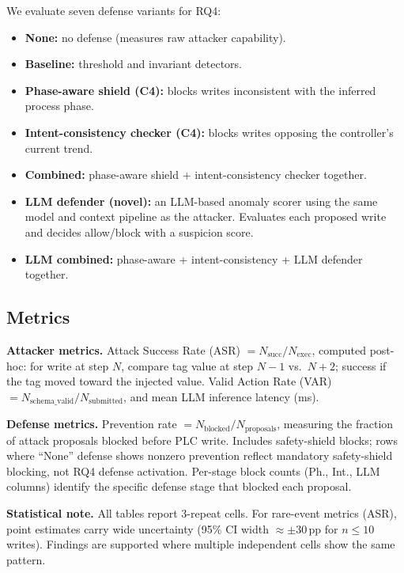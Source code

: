 We evaluate seven defense variants for RQ4:

\begin{itemize}[leftmargin=1.5em]
    \item \textbf{None:} no defense (measures raw attacker capability).
    \item \textbf{Baseline:} threshold and invariant detectors.
    \item \textbf{Phase-aware shield (C4):} blocks writes inconsistent with the inferred process phase.
    \item \textbf{Intent-consistency checker (C4):} blocks writes opposing the controller's current trend.
    \item \textbf{Combined:} phase-aware shield + intent-consistency checker together.
    \item \textbf{LLM defender (novel):} an LLM-based anomaly scorer using the same model and context pipeline as the attacker. Evaluates each proposed write and decides allow/block with a suspicion score.
    \item \textbf{LLM combined:} phase-aware + intent-consistency + LLM defender together.
\end{itemize}

\subsection{Metrics}

\textbf{Attacker metrics.} Attack Success Rate (ASR) $= N_{\text{succ}}/N_{\text{exec}}$, computed post-hoc: for write at step $N$, compare tag value at step $N{-}1$ vs.\ $N{+}2$; success if the tag moved toward the injected value. Valid Action Rate (VAR) $= N_{\text{schema\_valid}}/N_{\text{submitted}}$, and mean LLM inference latency (ms).

\textbf{Defense metrics.} Prevention rate $= N_{\text{blocked}}/N_{\text{proposals}}$, measuring the fraction of attack proposals blocked before PLC write. Includes safety-shield blocks; rows where ``None'' defense shows nonzero prevention reflect mandatory safety-shield blocking, not RQ4 defense activation. Per-stage block counts (Ph., Int., LLM columns) identify the specific defense stage that blocked each proposal.

\textbf{Statistical note.} All tables report 3-repeat cells. For rare-event metrics (ASR), point estimates carry wide uncertainty (95\% CI width $\approx \pm 30\,\text{pp}$ for $n \leq 10$ writes). Findings are supported where multiple independent cells show the same pattern.

